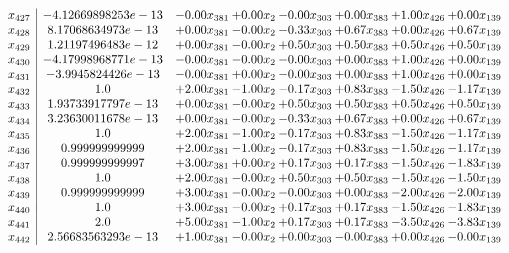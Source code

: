 \documentclass[8pt]{article}
\begin{document}
\[\begin{array}{c| c c@{\hskip 2pt} c@{\hskip 2pt} c@{\hskip 2pt} c@{\hskip 2pt} c@{\hskip 2pt} c@{\hskip 2pt} }
 x_{427}   &  -4.12669898253e-13 & -0.00 x_{381} & +  0.00 x_{2} & -0.00 x_{303} & +  0.00 x_{383} & +  1.00 x_{426} & +  0.00 x_{139}\\
 x_{428}   &  8.17068634973e-13 & +  0.00 x_{381} & -0.00 x_{2} & -0.33 x_{303} & +  0.67 x_{383} & +  0.00 x_{426} & +  0.67 x_{139}\\
 x_{429}   &  1.21197496483e-12 & +  0.00 x_{381} & -0.00 x_{2} & +  0.50 x_{303} & +  0.50 x_{383} & +  0.50 x_{426} & +  0.50 x_{139}\\
 x_{430}   &  -4.17998968771e-13 & -0.00 x_{381} & -0.00 x_{2} & -0.00 x_{303} & +  0.00 x_{383} & +  1.00 x_{426} & +  0.00 x_{139}\\
 x_{431}   &  -3.9945824426e-13 & -0.00 x_{381} & +  0.00 x_{2} & -0.00 x_{303} & +  0.00 x_{383} & +  1.00 x_{426} & +  0.00 x_{139}\\
 x_{432}   &  1.0 & +  2.00 x_{381} & -1.00 x_{2} & -0.17 x_{303} & +  0.83 x_{383} & -1.50 x_{426} & -1.17 x_{139}\\
 x_{433}   &  1.93733917797e-13 & +  0.00 x_{381} & -0.00 x_{2} & +  0.50 x_{303} & +  0.50 x_{383} & +  0.50 x_{426} & +  0.50 x_{139}\\
 x_{434}   &  3.23630011678e-13 & +  0.00 x_{381} & -0.00 x_{2} & -0.33 x_{303} & +  0.67 x_{383} & +  0.00 x_{426} & +  0.67 x_{139}\\
 x_{435}   &  1.0 & +  2.00 x_{381} & -1.00 x_{2} & -0.17 x_{303} & +  0.83 x_{383} & -1.50 x_{426} & -1.17 x_{139}\\
 x_{436}   &  0.999999999999 & +  2.00 x_{381} & -1.00 x_{2} & -0.17 x_{303} & +  0.83 x_{383} & -1.50 x_{426} & -1.17 x_{139}\\
 x_{437}   &  0.999999999997 & +  3.00 x_{381} & +  0.00 x_{2} & +  0.17 x_{303} & +  0.17 x_{383} & -1.50 x_{426} & -1.83 x_{139}\\
 x_{438}   &  1.0 & +  2.00 x_{381} & -0.00 x_{2} & +  0.50 x_{303} & +  0.50 x_{383} & -1.50 x_{426} & -1.50 x_{139}\\
 x_{439}   &  0.999999999999 & +  3.00 x_{381} & -0.00 x_{2} & -0.00 x_{303} & +  0.00 x_{383} & -2.00 x_{426} & -2.00 x_{139}\\
 x_{440}   &  1.0 & +  3.00 x_{381} & -0.00 x_{2} & +  0.17 x_{303} & +  0.17 x_{383} & -1.50 x_{426} & -1.83 x_{139}\\
 x_{441}   &  2.0 & +  5.00 x_{381} & -1.00 x_{2} & +  0.17 x_{303} & +  0.17 x_{383} & -3.50 x_{426} & -3.83 x_{139}\\
 x_{442}   &  2.56683563293e-13 & +  1.00 x_{381} & -0.00 x_{2} & +  0.00 x_{303} & -0.00 x_{383} & +  0.00 x_{426} & -0.00 x_{139}\\

\end{array}\]
\end{document}
